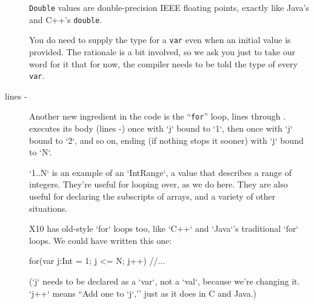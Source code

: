 \begin{description}
{\tt Double} values are double-precision IEEE floating points, exactly like Java's and C++'s
{\tt double}.  

You do need to supply
the type for a {\tt var} even when an initial value is provided.
The rationale is a bit involved, so we ask you just to take our word for it that  
for now, the compiler needs to be told the type of every {\tt var}. 

\item[lines  \xlref{mpi1-for}{7}- \xlref{mpi1-endfor}{11}]
Another new ingredient in the code is the ``{\tt for}''  loop, lines
 through .  
 executes its body (lines
-) once with \xcd`j` bound to \xcd`1`, then
once with \xcd`j` bound to \xcd`2`, and so on, ending (if nothing stops it
sooner) with \xcd`j` bound to \xcd`N`.  

\xcd`1..N` is an example of an \xcd`IntRange`, a value that describes a range
of integers.  They're useful for looping over, as we do here.  They are also
useful for declaring the subscripts of arrays, and a variety of other
situations. 


X10 has old-style \xcd`for` loops too, like \xcd`C++` and \xcd`Java`'s
traditional \xcd`for` loops.  We could have written this one:
\begin{xtennum}[]
    for(var j:Int = 1; j <= N; j++) {
       //...
    }
\end{xtennum}
(\xcd`j` needs to be declared as a \xcd`var`, not a \xcd`val`, because we're
changing it.  \xcd`j++` means ``Add one to \xcd`j`,'' just as it does in C and
Java.)


\end{description}
